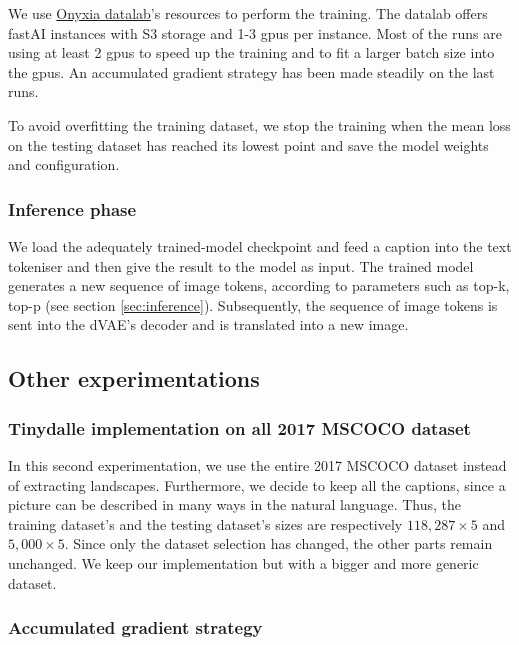 \documentclass{article}
\begin{document}
\begin{multicols}{2}
We use \href{https://datalab.sspcloud.fr/}{Onyxia datalab}'s resources to perform the training. The datalab offers fastAI instances with S3 storage and 1-3 \acrshort{gpu}s per instance. Most of the runs are using at least 2 \acrshort{gpu}s to speed up the training and to fit a larger batch size into the \acrshort{gpu}s. An accumulated gradient strategy has been made steadily on the last runs.

To avoid overfitting the training dataset, we stop the training when the mean loss on the testing dataset has reached its lowest point and save the model weights and configuration.

\subsubsection{Inference phase}

We load the adequately trained-model checkpoint and feed a caption into the text tokeniser and then give the result to the model as input. The trained model generates a new sequence of image tokens, according to parameters such as top-k, top-p (see section \ref{sec:inference}). Subsequently, the sequence of image tokens is sent into the dVAE's decoder and is translated into a new image.

\subsection{Other experimentations}

\subsubsection{Tinydalle implementation on all 2017 MSCOCO dataset}

In this second experimentation, we use the entire 2017 MSCOCO dataset instead of extracting landscapes. Furthermore, we decide to keep all the captions, since a picture can be described in many ways in the natural language. Thus, the training dataset's and the testing dataset's sizes are respectively $118,287\times 5$ and $5,000 \times 5$.
Since only the dataset selection has changed, the other parts remain unchanged. We keep our implementation but with a bigger and more generic dataset.

\subsubsection{Accumulated gradient strategy}


\end{multicols}
\end{document}
